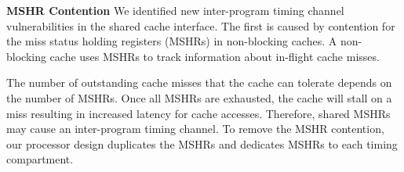 



\textbf{MSHR Contention}
We identified new inter-program timing channel vulnerabilities in the shared cache 
interface. The first is caused by contention for the miss status holding 
registers (MSHRs) in non-blocking caches.
A non-blocking cache uses MSHRs to track information about in-flight cache 
misses. %

The number of outstanding cache misses that the cache can tolerate depends on 
the number of MSHRs. Once all MSHRs are exhausted, the cache will stall on
a miss resulting in increased latency for cache accesses.
Therefore, shared MSHRs may cause an inter-program timing channel.
To remove the MSHR contention, our processor design duplicates
the MSHRs and dedicates MSHRs to each timing compartment.

